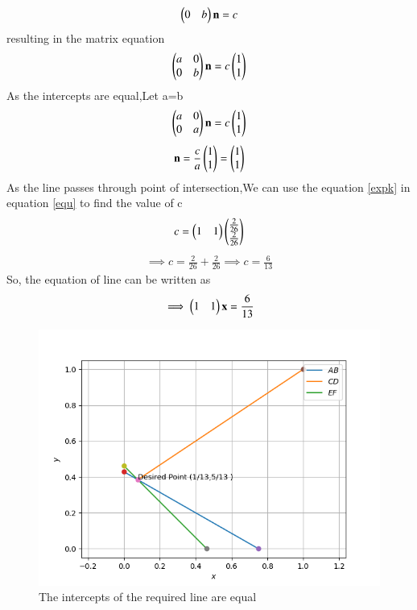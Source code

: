 \documentclass[journal,12pt,twocolumn]{IEEEtran}
\begin{document}
\begin{flushleft}
    \begin{align} 
    \begin{pmatrix}0 & b\end{pmatrix}\mathbf{n} = c
    \end{align}
    resulting in the matrix equation
    \begin{align}
    \begin{pmatrix}a & 0 \\ 0 & b\end{pmatrix}\mathbf{n} = c \begin{pmatrix}1 \\ 1\end{pmatrix}
    \end{align}
    As the intercepts are equal,Let a=b
    \begin{align}
    \begin{pmatrix}a & 0 \\ 0 & a\end{pmatrix}\mathbf{n} = c \begin{pmatrix}1 \\ 1\end{pmatrix}
    \end{align}
    \begin{align}
    \mathbf{n} = \frac{c}{a}\begin{pmatrix}1\\1\end{pmatrix} = \begin{pmatrix}1\\1\end{pmatrix}
    \end{align}
    As the line passes through point of intersection,We can use the equation \eqref{expk} in equation \eqref{equ} to find the value of c\\
    \begin{align}
    c=
    \begin{pmatrix}1 & 1\end{pmatrix}
    \begin{pmatrix}\frac{2}{26} \\  
    	\frac{2}{26} \end{pmatrix}
    \end{align}
    \begin{align}
    \implies c=\frac{2}{26}+\frac{2}{26}
    \implies c=\frac{6}{13}
    \end{align}
    So, the equation of line can be written as
    \begin{align}
    \implies
    \begin{pmatrix}1 & 1\end{pmatrix}
    	{\mathbf{x}} = \frac{6}{13}
    \end{align}
    \begin{figure}[!ht]
    \centering
    \includegraphics[width=\columnwidth]{Assignment_1}
     \caption{The intercepts of the required line are equal}
    \end{figure}
    \end{flushleft}
    
\end{document}
